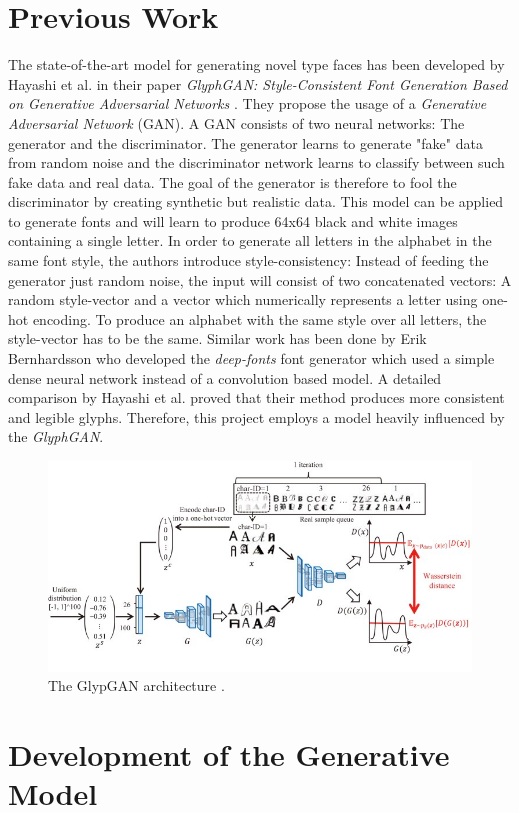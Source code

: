 \documentclass[11pt]{article}
\begin{document}
\section{Previous Work}
The state-of-the-art model for generating novel type faces has been developed by Hayashi et al. in their paper \emph{GlyphGAN: Style-Consistent Font Generation Based on Generative Adversarial Networks} \cite{glyphGan}. They propose the usage of a \emph{Generative Adversarial Network} \cite{gan} (GAN). A GAN consists of two neural networks: The generator and the discriminator. The generator learns to generate "fake" data from random noise and the discriminator network learns to classify between such fake data and real data. The goal of the generator is therefore to fool the discriminator by creating synthetic but realistic data. This model can be applied to generate fonts and will learn to produce 64x64 black and white images containing a single letter. In order to generate all letters in the alphabet in the same font style, the authors introduce style-consistency: Instead of feeding the generator just random noise, the input will consist of two concatenated vectors: A random style-vector and a vector which numerically represents a letter using one-hot encoding. To produce an alphabet with the same style over all letters, the style-vector has to be the same.
Similar work has been done by Erik Bernhardsson who developed the \emph{deep-fonts} \cite{deepFonts} font generator which used a simple dense neural network instead of a convolution based model.
A detailed comparison by Hayashi et al. proved that their method produces more consistent and legible glyphs. Therefore, this project employs a model heavily influenced by the \emph{GlyphGAN}.

\begin{figure}
    \centering
    \includegraphics[width=0.65\columnwidth]{glyphgan.png}
    \caption{The GlypGAN architecture \cite{glyphGanImage}.}
    \label{fig:glyphgan}
\end{figure}

\section{Development of the Generative Model}
\end{document}
